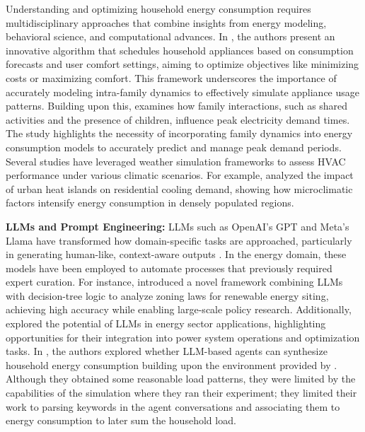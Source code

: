 Understanding and optimizing household energy consumption requires multidisciplinary approaches that combine insights from energy modeling, behavioral science, and computational advances. In \cite{duApplianceCommitmentHousehold2011}, the authors present an innovative algorithm that schedules household appliances based on consumption forecasts and user comfort settings, aiming to optimize objectives like minimizing costs or maximizing comfort. This framework underscores the importance of accurately modeling intra-family dynamics to effectively simulate appliance usage patterns. Building upon this, \cite{NICHOLLS2015116} examines how family interactions, such as shared activities and the presence of children, influence peak electricity demand times. The study highlights the necessity of incorporating family dynamics into energy consumption models to accurately predict and manage peak demand periods. Several studies have leveraged weather simulation frameworks to assess HVAC performance under various climatic scenarios. For example, \cite{xuEffectsCoolMaterials2024} analyzed the impact of urban heat islands on residential cooling demand, showing how microclimatic factors intensify energy consumption in densely populated regions. 

{\bf LLMs and Prompt Engineering:} LLMs such as OpenAI’s GPT and Meta’s Llama have transformed how domain-specific tasks are approached, particularly in generating human-like, context-aware outputs \cite{busterSupportingEnergyPolicy2024}. In the energy domain, these models have been employed to automate processes that previously required expert curation. For instance, \cite{busterSupportingEnergyPolicy2024} introduced a novel framework combining LLMs with decision-tree logic to analyze zoning laws for renewable energy siting, achieving high accuracy while enabling large-scale policy research. Additionally, \cite{majumderExploringCapabilitiesLimitations2024} explored the potential of LLMs in energy sector applications, highlighting opportunities for their integration into power system operations and optimization tasks. In \cite{almashor2024can}, the authors explored whether LLM-based agents can synthesize household energy consumption building upon the environment provided by \cite{park2023generative}. Although they obtained some reasonable load patterns, they were limited by the capabilities of the simulation where they ran their experiment; they limited their work to parsing keywords in the agent conversations and associating them to energy consumption to later sum the household load.

